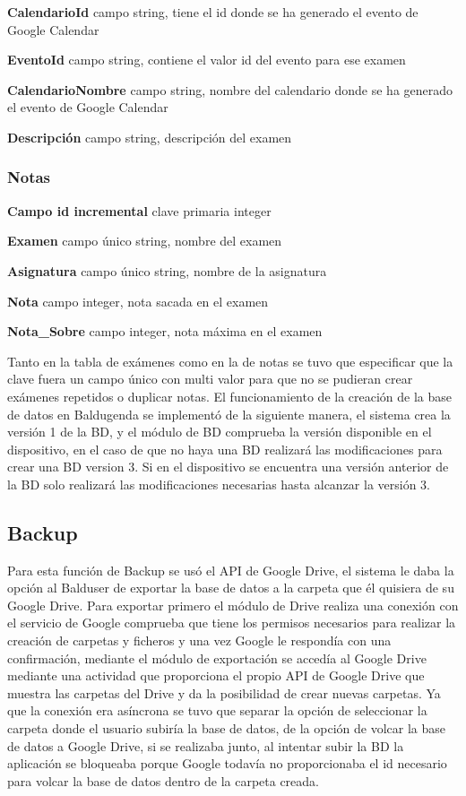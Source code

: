 \textbf{CalendarioId} campo string, tiene el id donde se ha generado el evento de Google Calendar

\textbf{EventoId} campo string, contiene el valor id del evento para ese examen

\textbf{CalendarioNombre} campo string, nombre del calendario donde se ha generado el evento de Google Calendar

\textbf{Descripción} campo string, descripción del examen

\subsubsection{Notas}
\label{subsubsecc:Notas}


\textbf{Campo id incremental} clave primaria integer

\textbf{Examen} campo único string, nombre del examen

\textbf{Asignatura} campo único string, nombre de la asignatura

\textbf{Nota} campo integer, nota sacada en el examen

\textbf{Nota\_Sobre} campo integer, nota máxima en el examen


Tanto en la tabla de exámenes como en la de notas se tuvo que especificar que la clave fuera un campo único con multi valor para que no se pudieran crear exámenes repetidos o duplicar notas.
El funcionamiento de la creación de la base de datos en Baldugenda se implementó de la siguiente manera, el sistema crea la versión 1 de la BD, y el módulo de BD comprueba la versión disponible en el dispositivo, en el caso de que no haya una BD realizará las modificaciones para crear una BD version 3. Si en el dispositivo se encuentra una versión anterior de la BD solo realizará las modificaciones necesarias hasta alcanzar la versión 3.


\subsection{Backup}
\label{subsecc:Backup}

Para esta función de Backup se usó el API de Google Drive, el sistema le daba la opción al Balduser de exportar la base de datos a la carpeta que él quisiera de su Google Drive.
Para exportar primero el módulo de Drive realiza una conexión con el servicio de Google comprueba que tiene los permisos necesarios para realizar la creación de carpetas y ficheros y una vez Google le respondía con una confirmación, mediante el módulo de exportación se accedía al Google Drive mediante una actividad que proporciona el propio API de Google Drive que muestra las carpetas del Drive y da la posibilidad de crear nuevas carpetas.
Ya que la conexión era asíncrona se tuvo que separar la opción de seleccionar la carpeta donde el usuario subiría la base de datos, de la opción de volcar la base de datos a Google Drive,  si se realizaba junto, al intentar subir la BD la aplicación se bloqueaba porque Google todavía no proporcionaba el id necesario para volcar la base de datos dentro de la carpeta creada.

